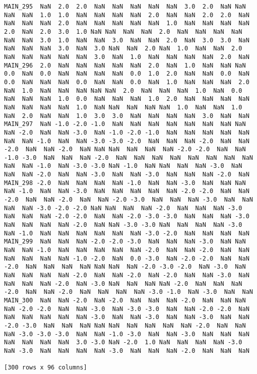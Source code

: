 \documentclass[a4paper,10pt,onecolumn,oneside,openright]{article}
\begin{document}
\begin{verbatim}
MAIN_295  NaN  2.0  2.0  NaN  NaN  NaN  NaN  NaN  3.0  2.0  NaN NaN  NaN  NaN  1.0  1.0  NaN  NaN  NaN  NaN  2.0  NaN  NaN  2.0  2.0  NaN  NaN  NaN  NaN  2.0  NaN  NaN  NaN  NaN  NaN  1.0  NaN  NaN  NaN  NaN  2.0  NaN  2.0  3.0  1.0 NaN NaN  NaN  NaN  2.0  NaN  NaN  NaN  NaN  NaN  NaN  3.0  1.0  NaN  NaN  3.0  NaN  NaN  2.0  NaN  3.0  3.0  NaN NaN  NaN  NaN  3.0  NaN  3.0 NaN  NaN  2.0 NaN  1.0  NaN  NaN  2.0  NaN  NaN  NaN  NaN  NaN  3.0  NaN  1.0  NaN  NaN  NaN  NaN  2.0  NaN
MAIN_296  2.0  NaN  NaN  NaN  NaN  NaN  2.0  NaN  1.0  NaN  NaN NaN  0.0  NaN  0.0  NaN  NaN  NaN  NaN  0.0  1.0  2.0  NaN  NaN  0.0  NaN  0.0  NaN  NaN  NaN  0.0  NaN  NaN  0.0  NaN  1.0  NaN  NaN  NaN  2.0  NaN  1.0  NaN  NaN  NaN NaN NaN  2.0  NaN  NaN  NaN  1.0  NaN  0.0  NaN  NaN  NaN  1.0  0.0  NaN  NaN  NaN  1.0  2.0  NaN  NaN  NaN  NaN NaN  NaN  NaN  NaN  1.0  NaN NaN  NaN  NaN NaN  1.0  NaN  NaN  1.0  NaN  2.0  NaN  NaN  1.0  3.0  3.0  NaN  NaN  NaN  NaN  3.0  NaN  NaN
MAIN_297  NaN -1.0 -2.0 -1.0  NaN  NaN  NaN  NaN  NaN  NaN  NaN NaN  NaN -2.0  NaN  NaN -3.0  NaN -1.0 -2.0 -1.0  NaN  NaN  NaN  NaN  NaN  NaN  NaN -1.0  NaN  NaN -3.0 -3.0 -2.0  NaN  NaN  NaN -2.0  NaN  NaN -2.0  NaN  NaN -2.0  NaN NaN NaN  NaN  NaN  NaN -2.0 -2.0  NaN  NaN -1.0 -3.0  NaN  NaN  NaN -2.0  NaN  NaN  NaN  NaN  NaN  NaN  NaN  NaN NaN  NaN -1.0  NaN -3.0 -3.0 NaN -1.0  NaN NaN  NaN  NaN -3.0  NaN  NaN  NaN -2.0  NaN  NaN -3.0  NaN  NaN -3.0  NaN  NaN  NaN -2.0  NaN
MAIN_298 -2.0  NaN  NaN  NaN  NaN -1.0  NaN  NaN -3.0  NaN  NaN NaN  NaN -1.0  NaN  NaN -3.0  NaN  NaN  NaN  NaN  NaN -2.0 -2.0  NaN  NaN -2.0  NaN  NaN -2.0  NaN  NaN -2.0 -3.0  NaN  NaN  NaN -3.0  NaN  NaN  NaN  NaN -3.0 -2.0 -2.0 NaN NaN  NaN  NaN -2.0  NaN  NaN  NaN -3.0  NaN  NaN  NaN -2.0 -2.0  NaN  NaN -2.0 -3.0 -3.0  NaN  NaN  NaN -3.0 NaN  NaN  NaN  NaN -2.0  NaN NaN -3.0 -3.0 NaN  NaN  NaN  NaN -3.0  NaN -1.0  NaN  NaN  NaN  NaN  NaN  NaN -3.0 -2.0  NaN  NaN  NaN  NaN
MAIN_299  NaN  NaN  NaN -2.0 -2.0 -3.0  NaN  NaN  NaN -3.0  NaN NaN  NaN  NaN -1.0  NaN  NaN  NaN  NaN  NaN -2.0  NaN  NaN -2.0  NaN  NaN  NaN  NaN  NaN  NaN -1.0 -2.0  NaN  0.0 -3.0  NaN -2.0 -2.0  NaN  NaN -2.0  NaN  NaN  NaN  NaN NaN NaN  NaN -2.0 -3.0 -2.0  NaN -3.0  NaN  NaN  NaN  NaN  NaN -2.0  NaN  NaN -2.0  NaN -2.0  NaN  NaN -3.0  NaN NaN  NaN  NaN -2.0  NaN -3.0 NaN  NaN  NaN NaN -2.0  NaN  NaN  NaN -2.0  NaN  NaN -2.0  NaN  NaN  NaN  NaN -3.0 -1.0  NaN -3.0  NaN  NaN
MAIN_300  NaN  NaN -2.0  NaN -2.0  NaN  NaN  NaN -2.0  NaN  NaN NaN  NaN -2.0 -2.0  NaN  NaN -3.0  NaN -3.0 -3.0  NaN  NaN -2.0 -2.0  NaN  NaN  NaN  NaN  NaN  NaN -3.0  NaN  NaN -3.0  NaN  NaN -3.0  NaN  NaN -2.0 -3.0  NaN  NaN  NaN NaN NaN  NaN  NaN  NaN  NaN -2.0  NaN  NaN  NaN -3.0 -3.0 -3.0  NaN  NaN -1.0 -3.0  NaN  NaN -3.0  NaN  NaN  NaN NaN  NaN  NaN  NaN  3.0 -3.0 NaN -2.0  1.0 NaN  NaN  NaN  NaN -3.0  NaN -3.0  NaN  NaN  NaN  NaN -3.0  NaN  NaN  NaN -2.0  NaN  NaN  NaN

[300 rows x 96 columns]
\end{verbatim}
\end{document}
